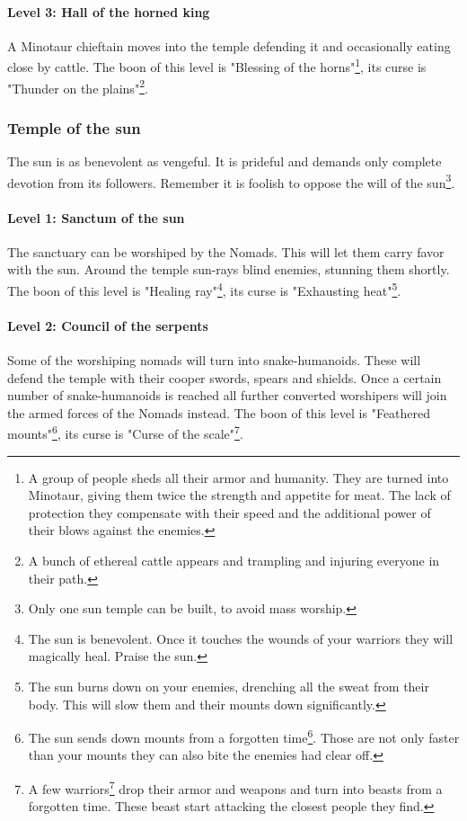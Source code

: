 \documentclass[a4paper]{article}
\begin{document}
			\paragraph{Level 3: Hall of the horned king}
				A Minotaur chieftain moves into the temple defending it
				and occasionally eating close by cattle.
				The boon of this level is "Blessing of the horns"\footnote{
					A group of people sheds all their armor and humanity.
					They are turned into Minotaur, giving them twice the strength
					and appetite for meat.
					The lack of protection they compensate with their speed and the additional
					power of their blows against the enemies.
				},
				its curse is "Thunder on the plains"\footnote{
					A bunch of ethereal cattle appears and trampling and injuring everyone in their path.
				}.

		\subsubsection{Temple of the sun}
			The sun is as benevolent as vengeful.
			It is prideful and demands only complete devotion from its followers.
			Remember it is foolish to oppose the will of the sun\footnote{
				Only one sun temple can be built, to avoid mass worship.
			}.

			\paragraph{Level 1: Sanctum of the sun}
				The sanctuary can be worshiped by the \gls{Nomads}.
				This will let them carry favor with the sun.
				Around the temple sun-rays blind enemies, stunning them shortly.
				The boon of this level is "Healing ray"\footnote{
					The sun is benevolent.
					Once it touches the wounds of your warriors they will magically heal.
					Praise the sun.
				},
				its curse is "Exhausting heat"\footnote{
					The sun burns down on your enemies, drenching all the sweat from their body.
					This will slow them and their mounts down significantly.
				}.

			\paragraph{Level 2: Council of the serpents}
				Some of the worshiping nomads will turn into snake-humanoids.
				These will defend the temple with their cooper swords, spears and shields.
				Once a certain number of snake-humanoids is reached all further converted
				worshipers will join the armed forces of the \gls{Nomads} instead.
				The boon of this level is "Feathered mounts"\footnote{
					The sun sends down mounts from a forgotten time\footnote{
						Terror-birds/raptors
					}.
					Those are not only faster than your mounts they can also bite the enemies had clear off.
				},
				its curse is "Curse of the scale"\footnote{
					A few warriors\footnote{
						foreign or domestic, the sun shines on all equally
					} drop their armor and weapons and turn into beasts from a forgotten time.
					These beast start attacking the closest people they find.
				}.
\end{document}
